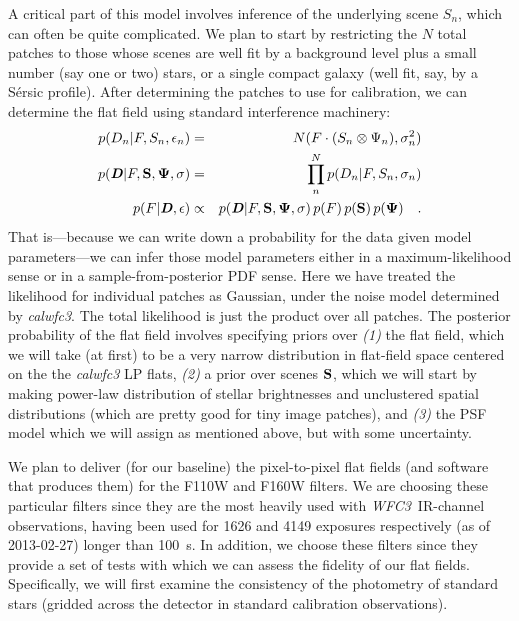 \documentclass[12pt]{article}
\newcommand{\project}[1]{\textsl{#1}}
\newcommand{\WFC}{\project{WFC3}}
\newcommand{\bvec}[1]{\textbf{\textit{#1}}}
\begin{document}
A critical part of this model involves inference of the underlying
scene $S_n$, which can often be quite complicated.  We plan to start by restricting the $N$ total patches to those whose
scenes are well fit by a background level plus a small number (say one or two) stars, or a single compact
galaxy (well fit, say, by a S\'{e}rsic profile).  After determining
the patches to use for calibration, we can determine the flat field
using standard interference machinery:
\begin{eqnarray}
p(D_n|F,S_n,\epsilon_n) &=& N(F \cdot (S_n \otimes \Psi_n), \sigma_n^2)
\\
p(\bvec{D}|F,{\bf S},{\bf \Psi},{\bf \sigma}) &=& \prod_n^N
p(D_n|F,S_n,\sigma_n) \\
p(F|\bvec{D},{\bf \epsilon}) & \propto & p(\bvec{D}|F,{\bf S},{\bf \Psi},{\bf
  \sigma})\, p(F)\, p({\bf S})\, p({\bf \Psi})
\quad .
\end{eqnarray}
That is---because we can write down a probability for the data given model
parameters---we can infer those model parameters either in a maximum-likelihood
sense or in a sample-from-posterior PDF sense.
Here we have treated the likelihood for individual patches as
Gaussian, under the noise model determined by \textsl{calwfc3}.  The
total likelihood is just the product over all patches.  The posterior
probability of the flat field involves specifying priors over
\textsl{(1)} the flat field, which we will take (at first) to be a
very narrow distribution in flat-field space centered on the the
\textsl{calwfc3} LP flats, \textsl{(2)} a prior over scenes ${\bf S}$,
which we will start by making power-law distribution of stellar
brightnesses and unclustered spatial distributions (which are pretty
good for tiny image patches), and \textsl{(3)} the PSF model which we
will assign as mentioned above, but with some uncertainty.

We plan to deliver (for our baseline) the pixel-to-pixel flat fields
(and software that produces them) for the F110W and F160W filters.  We
are choosing these particular filters since they are the most
heavily used with \WFC\ IR-channel observations, having been used for
1626 and 4149 exposures respectively (as of 2013-02-27) longer than
100~s.  In addition, we choose these filters since they provide a set
of tests with which we can assess the fidelity of our flat fields.
Specifically, we will first examine the consistency of the photometry
of standard stars (gridded across the detector in standard calibration observations).
\end{document}

